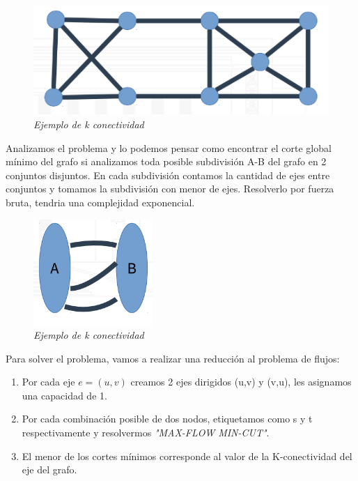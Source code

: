 \documentclass{article}
\begin{document}
\begin{figure}[h!]
    \begin{center} 
    \includegraphics[scale=0.5]{imagenes/ejemplo-k-conectividad.png}
    \caption{\small \sl Ejemplo de k conectividad} 
    \end{center}
\end{figure}

Analizamos el problema y lo podemos pensar como encontrar el corte global mínimo del grafo si
analizamos toda posible subdivisión A-B del grafo en 2 conjuntos disjuntos. En cada 
subdivisión contamos la cantidad de ejes entre conjuntos y tomamos la subdivisión con menor 
de ejes. Resolverlo por fuerza bruta, tendria una complejidad exponencial.

\begin{figure}[h!]
    \begin{center} 
    \includegraphics[scale=0.5]{imagenes/ejemplo-subdivicion.png}
    \caption{\small \sl Ejemplo de k conectividad} 
    \end{center}
\end{figure}

Para solver el problema, vamos a realizar una reducción al problema de flujos:

\begin{enumerate}
    \item Por cada eje \(e=(u,v)\) creamos 2 ejes dirigidos (u,v) y (v,u), les asignamos una capacidad de 1.
    \item Por cada combinación posible de dos nodos, etiquetamos como s y t respectivamente y resolvermos \textit{"MAX-FLOW MIN-CUT"}.
    \item El menor de los cortes mínimos corresponde al valor de la K-conectividad del eje del grafo.
\end{enumerate}
\end{document}
